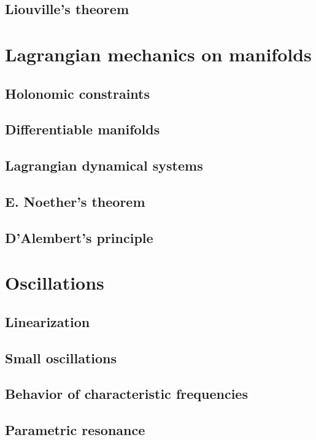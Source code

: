 \documentclass{book}
\numberwithin{equation}{section}
\theoremstyle{plain}
\theoremstyle{definition}
\theoremstyle{remark}
\theoremstyle{remark}
\begin{document}
\section{Liouville's theorem}

\chapter{Lagrangian mechanics on manifolds}

\section{Holonomic constraints}

\section{Differentiable manifolds}

\section{Lagrangian dynamical systems}

\section{E. Noether's theorem}

\section{D'Alembert's principle}

\chapter{Oscillations}

\section{Linearization}

\section{Small oscillations}

\section{Behavior of characteristic frequencies}

\section{Parametric resonance}
\end{document}
